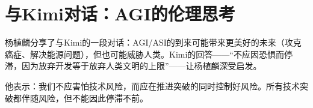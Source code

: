 \section{与Kimi对话：AGI的伦理思考}

杨植麟分享了与Kimi的一段对话：AGI/ASI的到来可能带来更美好的未来（攻克癌症、解决能源问题），但也可能威胁人类。Kimi的回答——``不应因恐惧而停滞，因为放弃开发等于放弃人类文明的上限''——让杨植麟深受启发。

他表示：我们不应害怕技术风险，而应在推进突破的同时控制好风险。所有技术突破都伴随风险，但不能因此停滞不前。


